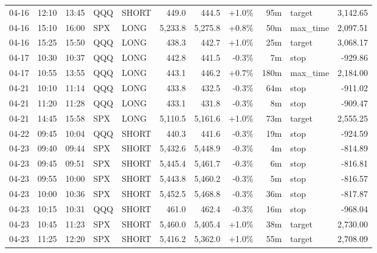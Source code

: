 \documentclass[11pt,a4paper,twoside]{article}
\begin{document}
\begin{center}
\begin{longtable}{>{\color{txtmain}}l l l l l r r r r >{\color{txtmain}}l r}
04-16 & 12:10 & 13:45 & QQQ & SHORT & 449.0 & 444.5 & \textcolor{wingreen}{+1.0\%} & 95m & target & \textcolor{wingreen}{3,142.65} \\
04-16 & 15:10 & 16:00 & SPX & LONG & 5,233.8 & 5,275.8 & \textcolor{wingreen}{+0.8\%} & 50m & max\_time & \textcolor{wingreen}{2,097.51} \\
04-16 & 15:25 & 15:50 & QQQ & LONG & 438.3 & 442.7 & \textcolor{wingreen}{+1.0\%} & 25m & target & \textcolor{wingreen}{3,068.17} \\
04-17 & 10:30 & 10:37 & QQQ & LONG & 442.8 & 441.5 & \textcolor{lossred}{-0.3\%} & 7m & stop & \textcolor{lossred}{-929.86} \\
04-17 & 10:55 & 13:55 & QQQ & LONG & 443.1 & 446.2 & \textcolor{wingreen}{+0.7\%} & 180m & max\_time & \textcolor{wingreen}{2,184.00} \\
04-21 & 10:10 & 11:14 & QQQ & LONG & 433.8 & 432.5 & \textcolor{lossred}{-0.3\%} & 64m & stop & \textcolor{lossred}{-911.02} \\
04-21 & 11:20 & 11:28 & QQQ & LONG & 433.1 & 431.8 & \textcolor{lossred}{-0.3\%} & 8m & stop & \textcolor{lossred}{-909.47} \\
04-21 & 14:45 & 15:58 & SPX & LONG & 5,110.5 & 5,161.6 & \textcolor{wingreen}{+1.0\%} & 73m & target & \textcolor{wingreen}{2,555.25} \\
04-22 & 09:45 & 10:04 & QQQ & SHORT & 440.3 & 441.6 & \textcolor{lossred}{-0.3\%} & 19m & stop & \textcolor{lossred}{-924.59} \\
04-23 & 09:40 & 09:44 & SPX & SHORT & 5,432.6 & 5,448.9 & \textcolor{lossred}{-0.3\%} & 4m & stop & \textcolor{lossred}{-814.89} \\
04-23 & 09:45 & 09:51 & SPX & SHORT & 5,445.4 & 5,461.7 & \textcolor{lossred}{-0.3\%} & 6m & stop & \textcolor{lossred}{-816.81} \\
04-23 & 09:55 & 10:00 & SPX & SHORT & 5,443.8 & 5,460.2 & \textcolor{lossred}{-0.3\%} & 5m & stop & \textcolor{lossred}{-816.57} \\
04-23 & 10:00 & 10:36 & SPX & SHORT & 5,452.5 & 5,468.8 & \textcolor{lossred}{-0.3\%} & 36m & stop & \textcolor{lossred}{-817.87} \\
04-23 & 10:15 & 10:31 & QQQ & SHORT & 461.0 & 462.4 & \textcolor{lossred}{-0.3\%} & 16m & stop & \textcolor{lossred}{-968.04} \\
04-23 & 10:45 & 11:23 & SPX & SHORT & 5,460.0 & 5,405.4 & \textcolor{wingreen}{+1.0\%} & 38m & target & \textcolor{wingreen}{2,730.00} \\
04-23 & 11:25 & 12:20 & SPX & SHORT & 5,416.2 & 5,362.0 & \textcolor{wingreen}{+1.0\%} & 55m & target & \textcolor{wingreen}{2,708.09} \\

\end{longtable}
\end{center}
\end{document}
